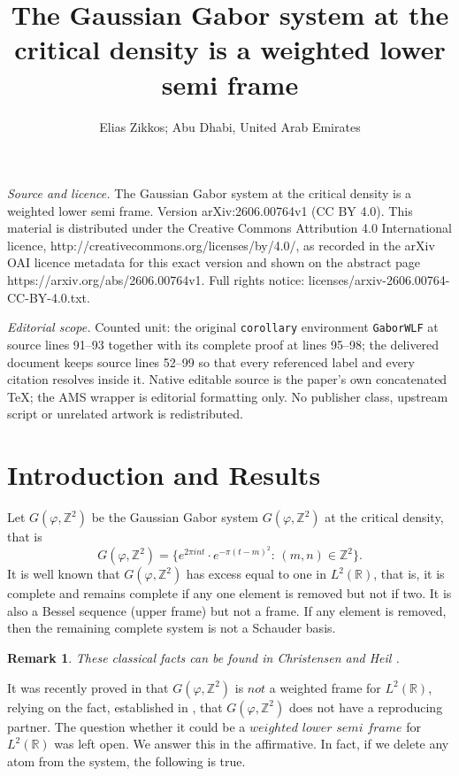 \documentclass[10pt,a4paper]{amsart}
\newtheorem{remark}{Remark}[section]
\begin{document}
\title[The Gaussian Gabor system at the critical density is a weigh]{The Gaussian Gabor system at the critical density is a weighted lower semi frame}
\author{Elias Zikkos; Abu Dhabi, United Arab Emirates}
\date{}
\maketitle
\noindent\emph{Source and licence.} The Gaussian Gabor system at the critical density is a weighted lower semi frame. Version arXiv:2606.00764v1 (CC BY 4.0). This material is distributed under the Creative Commons Attribution 4.0 International licence, http://creativecommons.org/licenses/by/4.0/, as recorded in the arXiv OAI licence metadata for this exact version and shown on the abstract page https://arxiv.org/abs/2606.00764v1. Full rights notice: licenses/arxiv-2606.00764-CC-BY-4.0.txt.\par\smallskip
\noindent\textit{Editorial scope.} Counted unit: the original \texttt{corollary} environment \texttt{GaborWLF} at source lines 91--93 together with its complete proof at lines 95--98; the delivered document keeps source lines 52--99 so that every referenced label and every citation resolves inside it. Native editable source is the paper's own concatenated TeX; the AMS wrapper is editorial formatting only. No publisher class, upstream script or unrelated artwork is redistributed.
\section{Introduction and Results}
\setcounter{equation}{0}

Let $G(\varphi, \mathbb{Z}^2)$ be the Gaussian Gabor system $G(\varphi, \mathbb{Z}^2)$ at the critical density, that is
\[
G(\varphi, \mathbb{Z}^2)=\{e^{2\pi int}\cdot e^{-\pi(t-m)^2}:\, (m,n)\in \mathbb{Z}^2\}.
\]
It is well known that $G(\varphi, \mathbb{Z}^2)$ has excess equal to one in $L^2 (\mathbb{R})$, that is,
it is complete and remains complete if any one element is removed but not if two.
It is also a Bessel sequence (upper frame) but not a frame. If any element is removed, then the remaining complete system is not a Schauder basis.
\begin{remark}
These classical facts can be found in Christensen \cite[Corollary 11.4.3 and Theorem 11.6.1]{Christensen}  
and Heil \cite[Example 11.34]{Heil}.
\end{remark}

It was recently proved in \cite[Section 6]{Balazs2026JFAA} that $G(\varphi, \mathbb{Z}^2)$ is $not$ a weighted
frame for $L^2 (\mathbb{R})$, relying on the fact, established in \cite[Corollaries 2.6 and 4.3]{Heil2025JFAA},\emph{} 
that $G(\varphi, \mathbb{Z}^2)$ does not have a reproducing partner.
The question whether it could be a $weighted\,\, lower\,\, semi\,\, frame$
for $L^2 (\mathbb{R})$ was left open. We answer this in the affirmative.
In fact, if we delete any atom from the system, the following is true.
\end{document}
